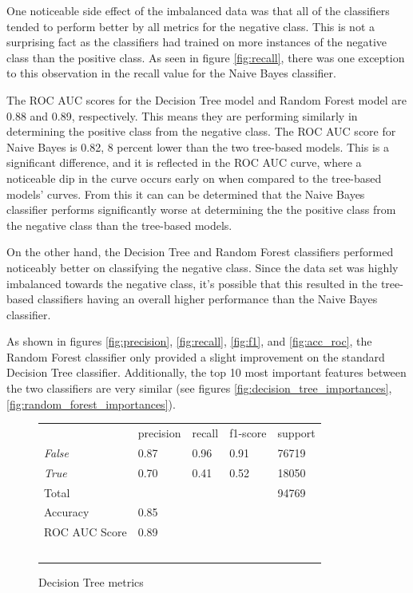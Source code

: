 \documentclass[10pt, conference, compsocconf]{IEEEtran}
\begin{document}
One noticeable side effect of the imbalanced data was that all of the classifiers tended to perform better by all metrics for the negative class. This is not a surprising fact as the classifiers had trained on more instances of the negative class than the positive class. As seen in figure \ref{fig:recall}, there was one exception to this observation in the recall value for the Naive Bayes classifier.

The ROC AUC scores for the Decision Tree model and Random Forest model are 0.88 and 0.89, respectively. This means they are performing similarly in determining the positive class from the negative class. The ROC AUC score for Naive Bayes is 0.82, 8 percent lower than the two tree-based models. This is a significant difference, and it is reflected in the ROC AUC curve, where a noticeable dip in the curve occurs early on when compared to the tree-based models' curves. From this it can can be determined that the Naive Bayes classifier performs significantly worse at determining the the positive class from the negative class than the tree-based models.

On the other hand, the Decision Tree and Random Forest classifiers performed noticeably better on classifying the negative class. Since the data set was highly imbalanced towards the negative class, it's possible that this resulted in the tree-based classifiers having an overall higher performance than the Naive Bayes classifier.

As shown in figures \ref{fig:precision}, \ref{fig:recall}, \ref{fig:f1}, and \ref{fig:acc_roc}, the Random Forest classifier only provided a slight improvement on the standard Decision Tree classifier. Additionally, the top 10 most important features between the two classifiers are very similar (see figures \ref{fig:decision_tree_importances}, \ref{fig:random_forest_importances}).


\begin{figure}
  \begin{tabular}{lllll}
                  & precision & recall      & f1-score  & support \\
  \textit{False}  & 0.87      & 0.96        & 0.91      & 76719 \\
  \textit{True}   & 0.70      & 0.41        & 0.52      & 18050 \\
  Total			      &           &             &           & 94769 \\
  Accuracy        & 0.85 \\
  ROC AUC Score	  & 0.89 \\\
  \end{tabular}
  \caption{Decision Tree metrics}
  \label{fig:decision_tree_metrics}
\end{figure}
\end{document}
